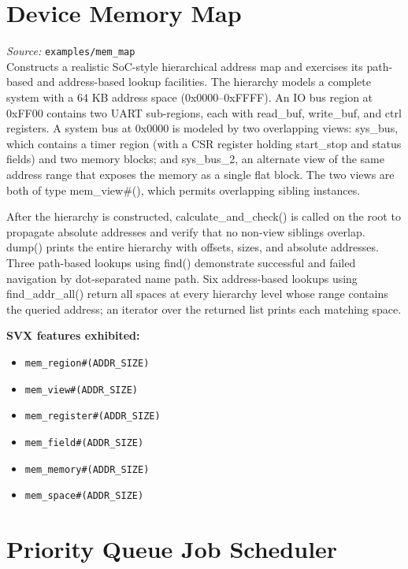 \documentclass[11pt,letterpaper]{report}
\begin{document}
\section{Device Memory Map}

\textit{Source:} \texttt{examples/mem\_map}\\

Constructs a realistic SoC-style hierarchical address map and exercises its path-based and address-based lookup facilities. The hierarchy models a complete system with a 64 KB address space (0x0000--0xFFFF). An IO bus region at 0xFF00 contains two UART sub-regions, each with read\_buf, write\_buf, and ctrl registers. A system bus at 0x0000 is modeled by two overlapping views: sys\_bus, which contains a timer region (with a CSR register holding start\_stop and status fields) and two memory blocks; and sys\_bus\_2, an alternate view of the same address range that exposes the memory as a single flat block. The two views are both of type mem\_view\#(), which permits overlapping sibling instances.

After the hierarchy is constructed, calculate\_and\_check() is called on the root to propagate absolute addresses and verify that no non-view siblings overlap. dump() prints the entire hierarchy with offsets, sizes, and absolute addresses. Three path-based lookups using find() demonstrate successful and failed navigation by dot-separated name path. Six address-based lookups using find\_addr\_all() return all spaces at every hierarchy level whose range contains the queried address; an iterator over the returned list prints each matching space.

\textbf{SVX features exhibited:}

\begin{itemize}
  \item \texttt{mem\_region\#(ADDR\_SIZE)}
  \item \texttt{mem\_view\#(ADDR\_SIZE)}
  \item \texttt{mem\_register\#(ADDR\_SIZE)}
  \item \texttt{mem\_field\#(ADDR\_SIZE)}
  \item \texttt{mem\_memory\#(ADDR\_SIZE)}
  \item \texttt{mem\_space\#(ADDR\_SIZE)}
\end{itemize}
\section{Priority Queue Job Scheduler}
\end{document}
